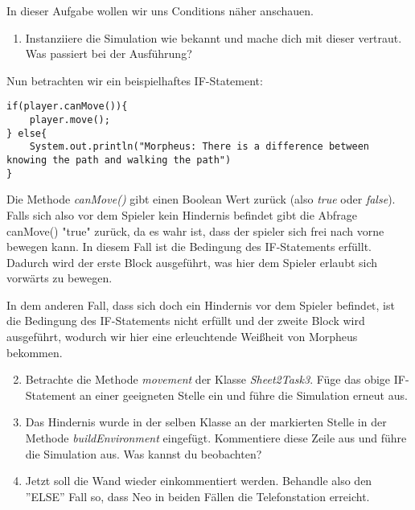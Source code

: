 In dieser Aufgabe wollen wir uns Conditions näher anschauen.
\begin{enumerate}[label=\alph*)]                           
    \item Instanziiere die Simulation wie bekannt und mache dich mit dieser vertraut.
    Was passiert bei der Ausführung?
\end{enumerate}

\begin{Infobox}[IF-Condition]
    Nun betrachten wir ein beispielhaftes IF-Statement:
    \begin{lstlisting}[breaklines=true, numbers=none]
if(player.canMove()){
    player.move();
} else{
    System.out.println("Morpheus: There is a difference between knowing the path and walking the path")
}
    \end{lstlisting}
    Die Methode \textit{canMove()} gibt einen Boolean Wert zurück (also \textit{true} oder \textit{false}).
    Falls sich also vor dem Spieler kein Hindernis befindet gibt die Abfrage canMove() "true" zurück, da es wahr ist, dass der spieler sich frei nach vorne bewegen kann.
   In diesem Fall ist die Bedingung des IF-Statements erfüllt. Dadurch wird der erste Block
    ausgeführt, was hier dem Spieler erlaubt sich vorwärts zu bewegen.\par 
    In dem anderen Fall, dass sich doch ein Hindernis vor dem Spieler befindet, ist die Bedingung des IF-Statements nicht erfüllt und 
    der zweite Block wird ausgeführt, wodurch wir hier eine erleuchtende Weißheit von Morpheus bekommen.
\end{Infobox}
\begin{enumerate}[label=\alph*)] \setcounter{enumi}{1}
    \item Betrachte die Methode \textit{movement} der Klasse \textit{Sheet2Task3}. Füge das obige IF-Statement an einer geeigneten Stelle ein 
    und führe die Simulation erneut aus.
    \item Das Hindernis wurde in der selben Klasse an der markierten Stelle in der Methode \textit{buildEnvironment} eingefügt.
    Kommentiere diese Zeile aus und führe die Simulation aus. Was kannst du beobachten?
    \item Jetzt soll die Wand wieder einkommentiert werden. Behandle also den ''ELSE'' Fall so, dass Neo in beiden Fällen die Telefonstation erreicht.

\end{enumerate}
